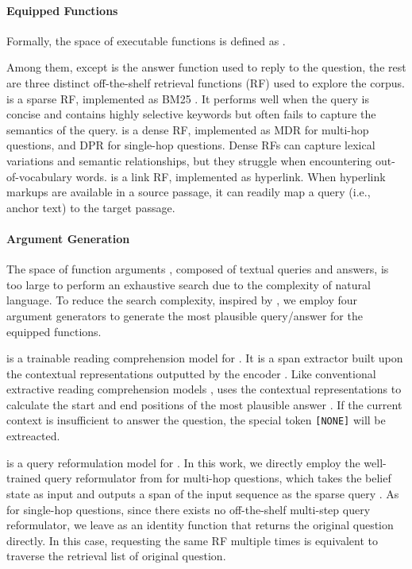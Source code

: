 \documentclass[11pt]{article}
\begin{document}
\paragraph{Equipped Functions}
Formally, the space of executable functions is defined as .

Among them, except  is the answer function used to reply to the question, the rest are three distinct off-the-shelf retrieval functions (RF) used to explore the corpus.
 is a sparse RF, implemented as BM25 \citep{10.1561/1500000019}. 
It performs well when the query is concise and contains highly selective keywords but often fails to capture the semantics of the query.
 is a dense RF, implemented as MDR \citep{xiong2021answering} for multi-hop questions, and DPR \citep{karpukhin-etal-2020-dense} for single-hop questions.
Dense RFs can capture lexical variations and semantic relationships, but they struggle when encountering out-of-vocabulary words. 
 is a link RF, implemented as hyperlink.
When hyperlink markups are available in a source passage, it can readily map a query (i.e., anchor text) to the target passage.

\paragraph{Argument Generation}
The space of function arguments , composed of textual queries and answers, is too large to perform an exhaustive search due to the complexity of natural language.
To reduce the search complexity, inspired by \citet{yao-etal-2020-keep}, we employ four argument generators to generate the most plausible query/answer for the equipped functions.

 is a trainable reading comprehension model for .
It is a span extractor built upon the contextual representations outputted by the encoder .
Like conventional extractive reading comprehension models \citep{yang-etal-2018-hotpotqa, Clark2020ELECTRA},  uses the contextual representations to calculate the start and end positions of the most plausible answer .
If the current context  is insufficient to answer the question, the special token \verb|[NONE]| will be extreacted.

 is a query reformulation model for .
In this work, we directly employ the well-trained query reformulator from \citet{qi-etal-2019-answering} for multi-hop questions, which takes the belief state  as input and outputs a span of the input sequence as the sparse query .
As for single-hop questions, since there exists no off-the-shelf multi-step query reformulator, we leave  as an identity function that returns the original question directly.
In this case, requesting the same RF multiple times is equivalent to traverse the retrieval list of original question.
\end{document}
